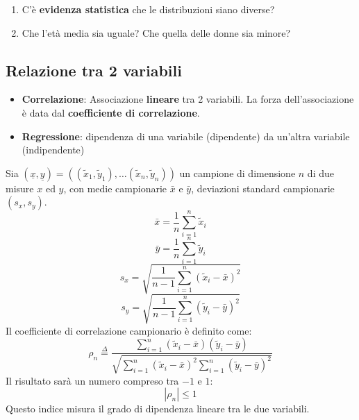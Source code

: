 \documentclass[a4paper]{article}
\theoremstyle{break}
\theoremstyle{break}
\theoremstyle{break}
\theoremstyle{break}
\begin{document}
\begin{enumerate}
	\item C'è \textbf{evidenza statistica} che le distribuzioni siano diverse?

	\item Che l'età media sia uguale? Che quella delle donne sia minore?
\end{enumerate}

\subsection{Relazione tra 2 variabili}
\begin{itemize}
	\item \textbf{Correlazione}: Associazione \textbf{lineare} tra 2 variabili. La forza
	      dell'associazione è data dal \textbf{coefficiente di correlazione}.
	\item \textbf{Regressione}: dipendenza di una variabile (dipendente) da
	      un’altra variabile (indipendente)
\end{itemize}

\noindent Sia \( (\underline{x}, \underline{y}) = ((\tilde{x}_1, \tilde{y}_1), \ldots (\tilde{x}_n, \tilde{y}_n)) \)
un campione di dimensione \( n \) di due misure \( x \) ed \( y \), con medie campionarie
\( \bar{x} \) e \( \bar{y} \), deviazioni standard campionarie \( (s_x, s_y) \).
\[
	\bar{x} = \frac{1}{n} \sum_{i=1}^{n} \tilde{x}_i
\]
\[
	\bar{y} = \frac{1}{n} \sum_{i=1}^{n} \tilde{y}_i
\]
\[
	s_x = \sqrt{\frac{1}{n-1} \sum_{i=1}^{n} (\tilde{x}_i - \bar{x})^2}
\]
\[
	s_y = \sqrt{\frac{1}{n-1} \sum_{i=1}^{n} (\tilde{y}_i - \bar{y})^2}
\]
Il coefficiente di correlazione campionario è definito come:
\[
	\rho_n \stackrel{\Delta}{=} \frac{\sum_{i=1}^{n} (\tilde{x}_i - \bar{x})
		(\tilde{y}_i - \bar{y})}{\sqrt{\sum_{i=1}^{n} (\tilde{x}_i - \bar{x})^2
			\sum_{i=1}^{n} (\tilde{y}_i - \bar{y})^2}}
\]
Il risultato sarà un numero compreso tra \( -1 \) e \( 1 \):
\[
	| \rho_n | \le 1
\]
Questo indice misura il grado di dipendenza lineare tra le due variabili.
\end{document}
